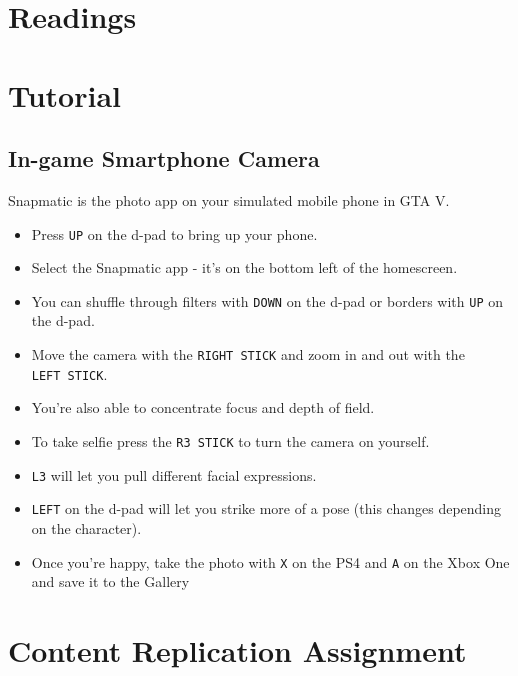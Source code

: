 \documentclass[
  openany]{book}
\begin{document}
\hypertarget{readings-1}{%
\section*{Readings}\label{readings-1}}

\hypertarget{tutorial-1}{%
\section*{Tutorial}\label{tutorial-1}}

\hypertarget{in-game-smartphone-camera}{%
\subsection*{In-game Smartphone Camera}\label{in-game-smartphone-camera}}

Snapmatic is the photo app on your simulated mobile phone in GTA V.

\begin{itemize}
\item
  Press \texttt{UP} on the d-pad to bring up your phone.
\item
  Select the Snapmatic app - it's on the bottom left of the homescreen.
\item
  You can shuffle through filters with \texttt{DOWN} on the d-pad or borders with \texttt{UP} on the d-pad.
\item
  Move the camera with the \texttt{RIGHT\ STICK} and zoom in and out with the \texttt{LEFT\ STICK}.
\item
  You're also able to concentrate focus and depth of field.
\item
  To take selfie press the \texttt{R3\ STICK} to turn the camera on yourself.
\item
  \texttt{L3} will let you pull different facial expressions.
\item
  \texttt{LEFT} on the d-pad will let you strike more of a pose (this changes depending on the character).
\item
  Once you're happy, take the photo with \texttt{X} on the PS4 and \texttt{A} on the Xbox One and save it to the Gallery
\end{itemize}

\hypertarget{content-replication-assignment-1}{%
\section*{Content Replication Assignment}\label{content-replication-assignment-1}}
\end{document}
